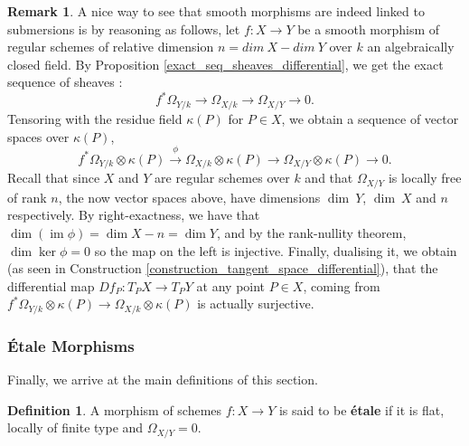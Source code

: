 \documentclass{article}
\theoremstyle{plain}
\newtheorem{lemma}[theorem]{Lemma}
\theoremstyle{definition}
\newtheorem{definition}[theorem]{Definition}
\newtheorem{remark}{Remark}
\DeclareMathOperator{\im}{im}
\begin{document}
\begin{remark}
A nice way to see that smooth morphisms are indeed linked to submersions is by reasoning as follows,
let $f:X\rightarrow Y$ be a smooth morphism of regular schemes of relative dimension $n=dim\:X-dim\:Y$ over $k$ an algebraically closed field.
By Proposition \ref{exact_seq_sheaves_differential}, we get the exact sequence of sheaves : 
$$f^*\Omega_{Y/k} \rightarrow \Omega_{X/k} \rightarrow \Omega_{X/Y} \rightarrow 0.$$ 
Tensoring with the residue field $\kappa(P)$ for $P\in X$, we obtain a sequence of vector spaces over $\kappa(P)$,
$$f^*\Omega_{Y/k} \otimes \kappa(P) \xrightarrow{\phi} \Omega_{X/k}\otimes \kappa(P) \rightarrow \Omega_{X/Y}\otimes \kappa(P) \rightarrow 0.$$ Recall that since $X$ and $Y$ are regular schemes over $k$ and that $\Omega_{X/Y}$ is locally free of rank $n$, the now vector spaces above, have dimensions $\dim\:Y$, $\dim\:X$ and $n$ respectively.
By right-exactness, we have that $\dim (\im\phi) = \dim X - n = \dim Y$, and by the rank-nullity theorem, $\dim \ker \phi = 0$ so the map on the left is injective.
Finally, dualising it, we obtain (as seen in Construction \ref{construction_tangent_space_differential}), that the differential map $Df_P: T_PX\rightarrow T_PY$ at any point $P\in X$, coming from $f^*\Omega_{Y/k}\otimes \kappa(P)\rightarrow \Omega_{X/k}\otimes \kappa(P)$ is actually surjective.
\end{remark}

\subsubsection{\'Etale Morphisms}

Finally, we arrive at the main definitions of this section.

\begin{definition}
    A morphism of schemes $f: X\rightarrow Y$ is said to be \textbf{\'etale} if it is flat, locally of finite type and $\Omega_{X/Y}=0$. 
\end{definition}
\end{document}
